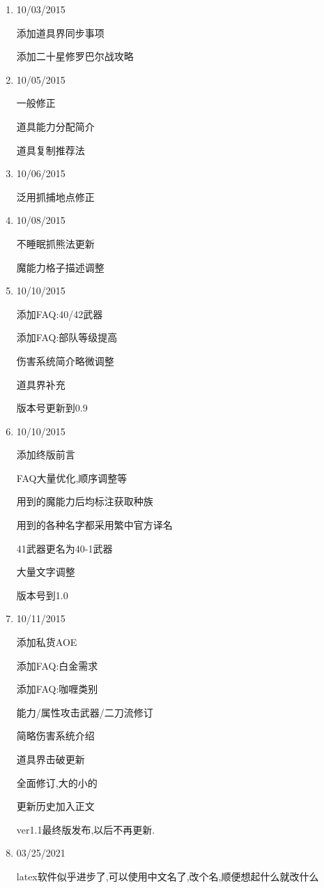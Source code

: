 \begin{enumerate}
		\item
		10/03/2015

		添加道具界同步事项

		添加二十星修罗巴尔战攻略

		\item
		10/05/2015

		一般修正

		道具能力分配简介

		道具复制推荐法

		\item
		10/06/2015

		泛用抓捕地点修正

		\item
		10/08/2015

		不睡眠抓熊法更新

		魔能力格子描述调整

		\item
		10/10/2015

		添加FAQ:40/42武器

		添加FAQ:部队等级提高

		伤害系统简介略微调整

		道具界补充

		版本号更新到0.9

		\item
		10/10/2015

		添加终版前言

		FAQ大量优化,顺序调整等

		用到的魔能力后均标注获取种族

		用到的各种名字都采用繁中官方译名

		41武器更名为40-1武器

		大量文字调整

		版本号到1.0

		\item
		10/11/2015

		添加私货AOE

		添加FAQ:白金需求

		添加FAQ:咖喱类别

		能力/属性攻击武器/二刀流修订

		简略伤害系统介绍

		道具界击破更新

		全面修订,大的小的

		更新历史加入正文

		ver1.1最终版发布,以后不再更新.

		\item 03/25/2021
		
		latex软件似乎进步了,可以使用中文名了,改个名,顺便想起什么就改什么

	\end{enumerate}
	

